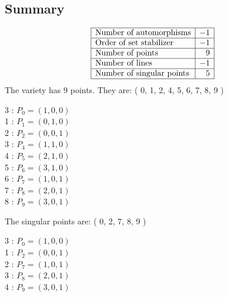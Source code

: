 \documentclass{article}
\begin{document}
{\subsection*{Summary}
{\renewcommand{\arraystretch}{1.5}
$$
\begin{array}{|l|r|}
\hline
\mbox{Number of automorphisms} & -1\\
\hline
\mbox{Order of set stabilizer} & -1\\
\hline
\mbox{Number of points} & 9\\
\hline
\mbox{Number of lines} & -1 \\
\hline
\mbox{Number of singular points} & 5\\
\hline
\end{array}
$$}
The variety has 9 points. They are: 
( 0, 1, 2, 4, 5, 6, 7, 8, 9 )\\
\begin{multicols}{3}
 : $P_{0}=( 1, 0, 0 )$\\
1 : $P_{1}=( 0, 1, 0 )$\\
2 : $P_{2}=( 0, 0, 1 )$\\
3 : $P_{4}=( 1, 1, 0 )$\\
4 : $P_{5}=( 2, 1, 0 )$\\
5 : $P_{6}=( 3, 1, 0 )$\\
6 : $P_{7}=( 1, 0, 1 )$\\
7 : $P_{8}=( 2, 0, 1 )$\\
8 : $P_{9}=( 3, 0, 1 )$\\
\end{multicols}
The singular points are: 
( 0, 2, 7, 8, 9 )\\
\begin{multicols}{3}
 : $P_{0}=( 1, 0, 0 )$\\
1 : $P_{2}=( 0, 0, 1 )$\\
2 : $P_{7}=( 1, 0, 1 )$\\
3 : $P_{8}=( 2, 0, 1 )$\\
4 : $P_{9}=( 3, 0, 1 )$\\
\end{multicols}


%


%


}%
\end{document}
